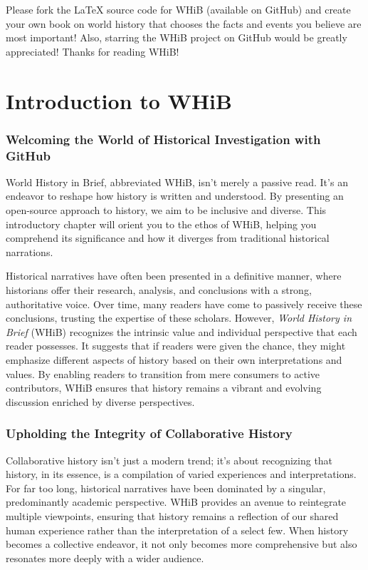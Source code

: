 \documentclass{book}
\begin{document}
Please fork the LaTeX source code for WHiB (available on GitHub) and create your own book on world history that chooses the facts and events you believe are most important! Also, starring the WHiB project on GitHub would be greatly appreciated! Thanks for reading WHiB!

\chapter{Introduction to WHiB}
\subsection*{Welcoming the World of Historical Investigation with GitHub}
World History in Brief, abbreviated WHiB, isn't merely a passive read. It's an endeavor to reshape how history is written and understood. By presenting an open-source approach to history, we aim to be inclusive and diverse. This introductory chapter will orient you to the ethos of WHiB, helping you comprehend its significance and how it diverges from traditional historical narrations.

Historical narratives have often been presented in a definitive manner, where historians offer their research, analysis, and conclusions with a strong, authoritative voice. Over time, many readers have come to passively receive these conclusions, trusting the expertise of these scholars. However, \emph{World History in Brief} (WHiB) recognizes the intrinsic value and individual perspective that each reader possesses. It suggests that if readers were given the chance, they might emphasize different aspects of history based on their own interpretations and values. By enabling readers to transition from mere consumers to active contributors, WHiB ensures that history remains a vibrant and evolving discussion enriched by diverse perspectives.

\subsection*{Upholding the Integrity of Collaborative History}

Collaborative history isn't just a modern trend; it's about recognizing that history, in its essence, is a compilation of varied experiences and interpretations. For far too long, historical narratives have been dominated by a singular, predominantly academic perspective. WHiB provides an avenue to reintegrate multiple viewpoints, ensuring that history remains a reflection of our shared human experience rather than the interpretation of a select few. When history becomes a collective endeavor, it not only becomes more comprehensive but also resonates more deeply with a wider audience.
\end{document}
